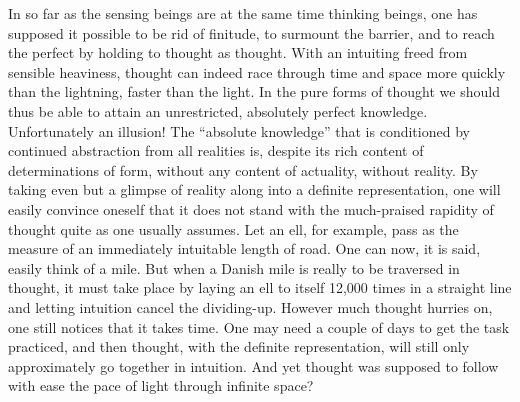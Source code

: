 \documentclass[12pt]{book}
\begin{document}
In so far as the sensing beings are at the same time thinking beings, one has
supposed it possible to be rid of finitude, to surmount the barrier, and to
reach the perfect by holding to thought as thought. With an intuiting freed from
sensible heaviness, thought can indeed race through time and space more quickly
than the lightning, faster than the light. In the pure forms of thought we
should thus be able to attain an unrestricted, absolutely perfect knowledge.
Unfortunately an illusion! The ``absolute knowledge'' that is conditioned by
continued abstraction from all realities is, despite its rich content of
determinations of form, without any content of actuality, without reality. By
taking even but a glimpse of reality along into a definite representation, one
will easily convince oneself that it does not stand with the much-praised
rapidity of thought quite as one usually assumes. Let an ell, for example, pass
as the measure of an immediately intuitable length of road. One can now, it is
said, easily think of a mile. But when a Danish mile is really to be traversed
in thought, it must take place by laying an ell to itself 12,000 times in a
straight line and letting intuition cancel the dividing-up. However much thought
hurries on, one still notices that it takes time. One may need a couple of days
to get the task practiced, and then thought, with the definite representation,
will still only approximately go together in intuition. And yet thought was
supposed to follow with ease the pace of light through infinite space?
\end{document}
